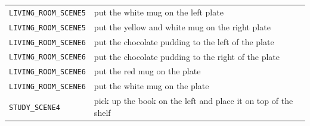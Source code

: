 \begin{table}[t]
\begin{tabular}{ll}
\texttt{LIVING\_ROOM\_SCENE5} & put the white mug on the left plate \\
\texttt{LIVING\_ROOM\_SCENE5} & put the yellow and white mug on the right plate \\
\texttt{LIVING\_ROOM\_SCENE6} & put the chocolate pudding to the left of the plate \\
\texttt{LIVING\_ROOM\_SCENE6} & put the chocolate pudding to the right of the plate \\
\texttt{LIVING\_ROOM\_SCENE6} & put the red mug on the plate \\
\texttt{LIVING\_ROOM\_SCENE6} & put the white mug on the plate \\
\texttt{STUDY\_SCENE4}        & pick up the book on the left and place it on top of the shelf \\
\bottomrule
\end{tabular}
\end{table}
